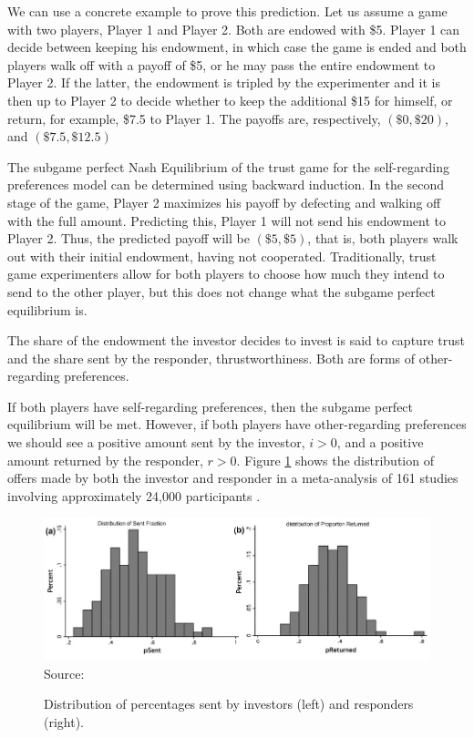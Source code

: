 \documentclass[12pt]{article}
\begin{document}
We can use a concrete example to prove this prediction. Let us assume a game with two players, Player 1 and Player 2. Both are endowed with \$5. Player 1 can decide between keeping his endowment, in which case the game is ended and both players walk off with a payoff of \$5, or he may pass the entire endowment to Player 2. If the latter, the endowment is tripled by the experimenter and it is then up to Player 2 to decide whether to keep the additional \$15 for himself, or return, for example, \$7.5 to Player 1. The payoffs are, respectively, $\left( \$ 0, \$20 \right)$, and  $\left( \$ 7.5, \$12.5 \right)$

The subgame perfect Nash Equilibrium of the trust game for the self-regarding preferences model can be determined using backward induction. In the second stage of the game, Player 2 maximizes his payoff by defecting and walking off with the full amount. Predicting this, Player 1 will not send his endowment to Player 2. Thus, the predicted payoff will be $\left (\$5,\$5 \right)$, that is, both players walk out with their initial endowment, having not cooperated. Traditionally, trust game experimenters allow for both players to choose how much they intend to send to the other player, but this does not change what the subgame perfect equilibrium is. 

The share of the endowment the investor decides to invest is said to capture trust and the share sent by the responder, thrustworthiness. Both are forms of other-regarding preferences.

If both players have self-regarding preferences, then the subgame perfect equilibrium will be met. However, if both players have other-regarding preferences we should see a positive amount sent by the investor, $i>0$, and a positive amount returned by the responder, $r>0$. Figure \ref{fig:turst1} shows the distribution of offers made by both the investor and responder in a meta-analysis of 161 studies involving approximately 24,000 participants \citep{Johnson2011}.
\\



\begin{figure}[H]
    \centering
    \caption{Distribution of percentages sent by investors (left) and responders (right).}
    \includegraphics[width=1\textwidth]{figure_trust1.png}
    Source: \cite{Johnson2011}
    \label{fig:turst1}
\end{figure}
\end{document}
